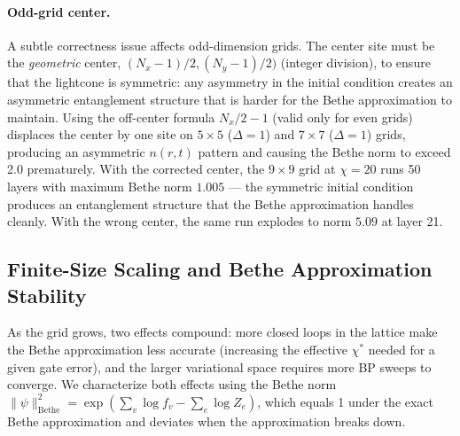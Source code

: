 \documentclass[11pt]{article}
\begin{document}
\paragraph{Odd-grid center.}
A subtle correctness issue affects odd-dimension grids.
The center site must be the \emph{geometric} center,
$(N_x-1)/2, (N_y-1)/2)$ (integer division), to ensure that the lightcone
is symmetric: any asymmetry in the initial condition creates an asymmetric
entanglement structure that is harder for the Bethe approximation to maintain.
Using the off-center formula $N_x/2 - 1$ (valid only for even grids) displaces
the center by one site on $5\times5$ ($\Delta = 1$) and $7\times7$
($\Delta = 1$) grids, producing an asymmetric $n(r,t)$ pattern and causing
the Bethe norm to exceed 2.0 prematurely.
With the corrected center, the $9\times9$ grid at $\chi=20$ runs 50 layers
with maximum Bethe norm $1.005$ --- the symmetric initial condition produces
an entanglement structure that the Bethe approximation handles cleanly.
With the wrong center, the same run explodes to norm $5.09$ at layer 21.

\subsection{Finite-Size Scaling and Bethe Approximation Stability}
\label{sec:finite_size}

As the grid grows, two effects compound: more closed loops in the lattice
make the Bethe approximation less accurate (increasing the effective
$\chi^*$ needed for a given gate error), and the larger variational space
requires more BP sweeps to converge.
We characterize both effects using the Bethe norm
$\|\psi\|^2_{\mathrm{Bethe}} = \exp(\sum_v \log f_v - \sum_e \log Z_e)$,
which equals 1 under the exact Bethe approximation and deviates when
the approximation breaks down.
\end{document}
